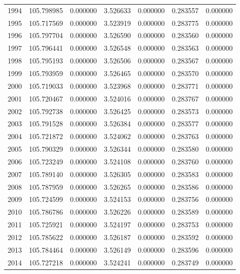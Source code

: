 \begin{tabular}{rrrrrrr}
1994 & 105.798985 &    0.000000 &  3.526633 &    0.000000 &    0.283557 &  0.000000 \\
1995 & 105.717569 &    0.000000 &  3.523919 &    0.000000 &    0.283775 &  0.000000 \\
1996 & 105.797704 &    0.000000 &  3.526590 &    0.000000 &    0.283560 &  0.000000 \\
1997 & 105.796441 &    0.000000 &  3.526548 &    0.000000 &    0.283563 &  0.000000 \\
1998 & 105.795193 &    0.000000 &  3.526506 &    0.000000 &    0.283567 &  0.000000 \\
1999 & 105.793959 &    0.000000 &  3.526465 &    0.000000 &    0.283570 &  0.000000 \\
2000 & 105.719033 &    0.000000 &  3.523968 &    0.000000 &    0.283771 &  0.000000 \\
2001 & 105.720467 &    0.000000 &  3.524016 &    0.000000 &    0.283767 &  0.000000 \\
2002 & 105.792738 &    0.000000 &  3.526425 &    0.000000 &    0.283573 &  0.000000 \\
2003 & 105.791528 &    0.000000 &  3.526384 &    0.000000 &    0.283577 &  0.000000 \\
2004 & 105.721872 &    0.000000 &  3.524062 &    0.000000 &    0.283763 &  0.000000 \\
2005 & 105.790329 &    0.000000 &  3.526344 &    0.000000 &    0.283580 &  0.000000 \\
2006 & 105.723249 &    0.000000 &  3.524108 &    0.000000 &    0.283760 &  0.000000 \\
2007 & 105.789140 &    0.000000 &  3.526305 &    0.000000 &    0.283583 &  0.000000 \\
2008 & 105.787959 &    0.000000 &  3.526265 &    0.000000 &    0.283586 &  0.000000 \\
2009 & 105.724599 &    0.000000 &  3.524153 &    0.000000 &    0.283756 &  0.000000 \\
2010 & 105.786786 &    0.000000 &  3.526226 &    0.000000 &    0.283589 &  0.000000 \\
2011 & 105.725921 &    0.000000 &  3.524197 &    0.000000 &    0.283753 &  0.000000 \\
2012 & 105.785622 &    0.000000 &  3.526187 &    0.000000 &    0.283592 &  0.000000 \\
2013 & 105.784464 &    0.000000 &  3.526149 &    0.000000 &    0.283596 &  0.000000 \\
2014 & 105.727218 &    0.000000 &  3.524241 &    0.000000 &    0.283749 &  0.000000 \\

\end{tabular}
